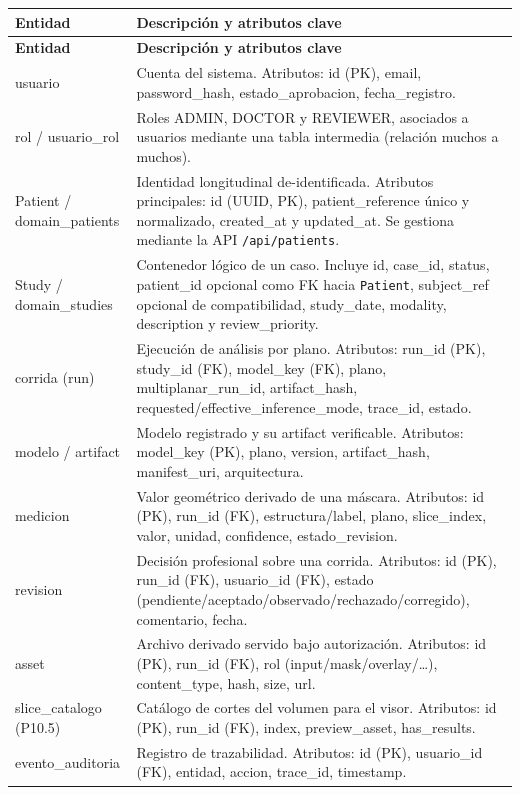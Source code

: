 {\footnotesize
\setlength{\LTleft}{0pt}
\setlength{\LTright}{0pt}
\setlength{\tabcolsep}{2pt}
\renewcommand{\arraystretch}{1.18}
\label{tab:arch-entidades-principales}
\begin{longtable}{>{\raggedright\arraybackslash}p{} >{\raggedright\arraybackslash}p{}}
\hline
\textbf{Entidad} & \textbf{Descripción y atributos clave} \\
\hline
\endfirsthead
\hline
\textbf{Entidad} & \textbf{Descripción y atributos clave} \\
\hline
\endhead
\hline
\endfoot
usuario & Cuenta del sistema. Atributos: id (PK), email, password\_hash, estado\_aprobacion, fecha\_registro. \\
rol / usuario\_rol & Roles ADMIN, DOCTOR y REVIEWER, asociados a usuarios mediante una tabla intermedia (relación muchos a muchos). \\
Patient / domain\_patients & Identidad longitudinal de-identificada. Atributos principales: id (UUID, PK), patient\_reference único y normalizado, created\_at y updated\_at. Se gestiona mediante la API \texttt{/api/patients}. \\
Study / domain\_studies & Contenedor lógico de un caso. Incluye id, case\_id, status, patient\_id opcional como FK hacia \texttt{Patient}, subject\_ref opcional de compatibilidad, study\_date, modality, description y review\_priority. \\
corrida (run) & Ejecución de análisis por plano. Atributos: run\_id (PK), study\_id (FK), model\_key (FK), plano, multiplanar\_run\_id, artifact\_hash, requested/effective\_inference\_mode, trace\_id, estado. \\
modelo / artifact & Modelo registrado y su artifact verificable. Atributos: model\_key (PK), plano, version, artifact\_hash, manifest\_uri, arquitectura. \\
medicion & Valor geométrico derivado de una máscara. Atributos: id (PK), run\_id (FK), estructura/label, plano, slice\_index, valor, unidad, confidence, estado\_revision. \\
revision & Decisión profesional sobre una corrida. Atributos: id (PK), run\_id (FK), usuario\_id (FK), estado (pendiente/aceptado/observado/rechazado/corregido), comentario, fecha. \\
asset & Archivo derivado servido bajo autorización. Atributos: id (PK), run\_id (FK), rol (input/mask/overlay/…), content\_type, hash, size, url. \\
slice\_catalogo (P10.5) & Catálogo de cortes del volumen para el visor. Atributos: id (PK), run\_id (FK), index, preview\_asset, has\_results. \\
evento\_auditoria & Registro de trazabilidad. Atributos: id (PK), usuario\_id (FK), entidad, accion, trace\_id, timestamp. \\
\hline
\end{longtable}
}

